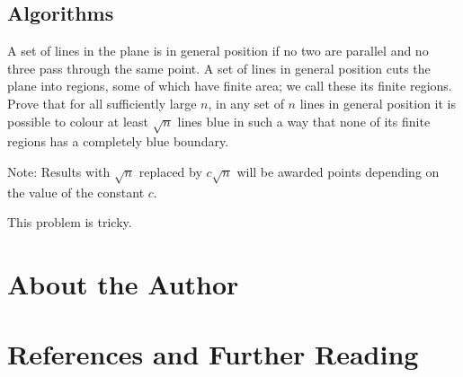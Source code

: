 \documentclass[11pt]{scrartcl}
\theoremstyle{plain} %
\theoremstyle{definition}
\theoremstyle{remark}
\theoremstyle{empty}
\theoremstyle{empty}
\theoremstyle{empty}
\theoremstyle{empty}
\theoremstyle{empty}
\theoremstyle{empty}
\begin{document}
\subsection{Algorithms}

\begin{problem}[2014 ISL C5]
  A set of lines in the plane is in general position if no two are parallel and no three pass through the same point. A set of lines in general position cuts the plane into regions, some of which have finite area; we call these its finite regions. Prove that for all sufficiently large $n$, in any set of $n$ lines in general position it is possible to colour at least $\sqrt{n}$ lines blue in such a way that none of its finite regions has a completely blue boundary.

Note: Results with $\sqrt{n}$ replaced by $c\sqrt{n}$ will be awarded points depending on the value of the constant $c$.
\end{problem}

\begin{solution}
  This problem is tricky. 
\end{solution}

\section{About the Author}

\section{References and Further Reading}
\end{document}
